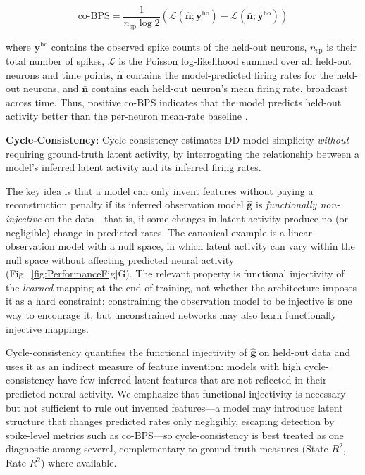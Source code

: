\documentclass{article}
\begin{document}
\[
\text{co-BPS} = \frac{1}{n_{\text{sp}} \log 2} \left( \mathcal{L}(\hat{\mathbf{n}}; \mathbf{y}^{\mathrm{ho}}) - \mathcal{L}(\bar{\mathbf{n}}; \mathbf{y}^{\mathrm{ho}}) \right)
\]

where $\mathbf{y}^{\mathrm{ho}}$ contains the observed spike counts of the held-out neurons, $n_{\mathrm{sp}}$ is their total number of spikes, $\mathcal{L}$ is the Poisson log-likelihood summed over all held-out neurons and time points, $\hat{\mathbf{n}}$ contains the model-predicted firing rates for the held-out neurons, and $\bar{\mathbf{n}}$ contains each held-out neuron's mean firing rate, broadcast across time. Thus, positive co-BPS indicates that the model predicts held-out activity better than the per-neuron mean-rate baseline \cite{pei_neural_2022}.

\textbf{Cycle-Consistency}:
Cycle-consistency estimates DD model simplicity \emph{without} requiring ground-truth latent activity, by interrogating the relationship between a model's inferred latent activity and its inferred firing rates.

The key idea is that a model can only invent features without paying a reconstruction penalty if its inferred observation model $\mathbf{\hat{g}}$ is \emph{functionally non-injective} on the data—that is, if some changes in latent activity produce no (or negligible) change in predicted rates. The canonical example is a linear observation model with a null space, in which latent activity can vary within the null space without affecting predicted neural activity (Fig.~\ref{fig:PerformanceFig}G). The relevant property is functional injectivity of the \emph{learned} mapping at the end of training, not whether the architecture imposes it as a hard constraint: constraining the observation model to be injective \cite{versteeg2023expressive} is one way to encourage it, but unconstrained networks may also learn functionally injective mappings.

Cycle-consistency quantifies the functional injectivity of $\mathbf{\hat{g}}$ on held-out data and uses it as an indirect measure of feature invention: models with high cycle-consistency have few inferred latent features that are not reflected in their predicted neural activity. We emphasize that functional injectivity is necessary but not sufficient to rule out invented features—a model may introduce latent structure that changes predicted rates only negligibly, escaping detection by spike-level metrics such as co-BPS—so cycle-consistency is best treated as one diagnostic among several, complementary to ground-truth measures (State $R^2$, Rate $R^2$) where available.
\end{document}
